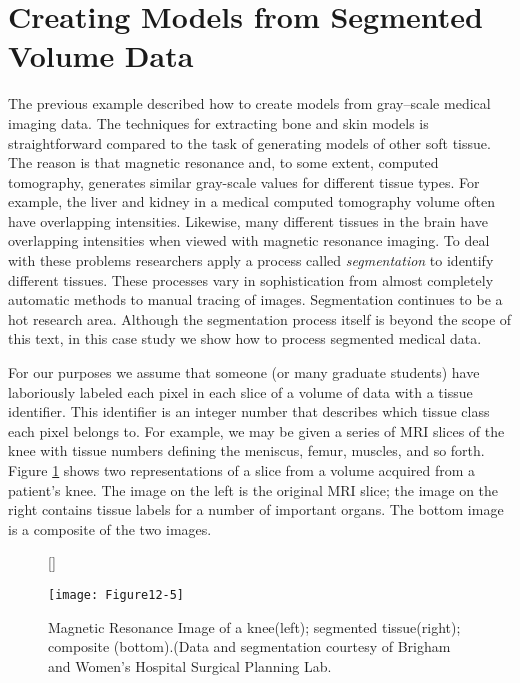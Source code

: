 \section{Creating Models from Segmented Volume Data}

The previous example described how to create models from gray--scale medical imaging data. The techniques for extracting bone and skin models is straightforward compared to the task of generating models of other soft tissue. The reason is that magnetic resonance and, to some extent, computed tomography, generates similar gray-scale values for different tissue types. For example, the liver and kidney in a medical computed tomography volume often have overlapping intensities. Likewise, many different tissues in the brain have overlapping intensities when viewed with magnetic resonance imaging. To deal with these problems researchers apply a process called \emph{segmentation} to identify different tissues. These processes vary in sophistication from almost completely automatic methods to manual tracing of images. Segmentation continues to be a hot research area. Although the segmentation process itself is beyond the scope of this text, in this case study we show how to process segmented medical data.

For our purposes we assume that someone (or many graduate students) have laboriously labeled each pixel in each slice of a volume of data with a tissue identifier. This identifier is an integer number that describes which tissue class each pixel belongs to. For example, we may be given a series of MRI slices of the knee with tissue numbers defining the meniscus, femur, muscles, and so forth. Figure \ref{fig:Figure12-5} shows two representations of a slice from a volume acquired from a patient's knee. The image on the left is the original MRI slice; the image on the right contains tissue labels for a number of important organs. The bottom image is a composite of the two images.

\begin{figure}[!htb]
    [\FBwidth]
    {\caption{Magnetic Resonance Image of a knee(left); segmented tissue(right); composite (bottom).(Data and segmentation courtesy of Brigham and Women's Hospital Surgical Planning Lab.}\label{fig:Figure12-5}}
    {\texttt{[image: Figure12-5]}}
\end{figure}

